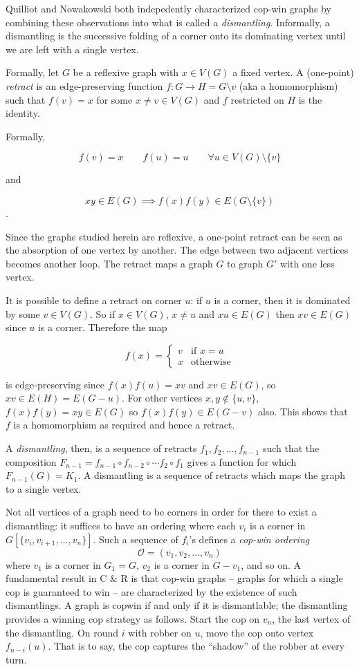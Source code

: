 Quilliot and Nowakowski both indepedently characterized cop-win graphs by combining these observations into what is called a \textit{dismantling}. Informally, a dismantling is the successive folding of a corner onto its dominating vertex until we are left with a single vertex.

Formally, let $G$ be a reflexive graph with $x\in V(G)$ a fixed vertex. A (one-point) \textit{retract} is an edge-preserving function $f : G \rightarrow H = G \setminus v$
(aka a homomorphism) such that $f(v) = x$ for some $x \neq v \in V(G)$ and $f$ restricted on $H$ is the identity.

Formally,

\[ f(v) = x \qquad f(u) = u \qquad \forall u \in V(G)\setminus \{ v \} \]

and

\[ xy \in E(G) \implies f(x)f(y) \in E(G \setminus \{ v \}) \].

Since the graphs studied herein are reflexive, a one-point retract can be seen as the
absorption of one vertex by another. The edge between two adjacent vertices becomes another loop.
The retract maps a graph $G$ to graph $G'$ with one less vertex.

It is possible to define a retract on corner $u$: if $u$ is a corner, then it is
dominated by some $v \in V(G)$. So if $x \in V(G)$, $x \neq u$ and
$xu \in E(G)$ then $xv \in E(G)$ since $u$ is a corner. Therefore the map

\[ f(x) = \begin{cases}
v & \text{if } x = u \\
x & \text{otherwise}
\end{cases} \]

is edge-preserving since $f(x)f(u) = xv$ and $xv \in E(G)$, so $xv \in E(H) = E(G - u)$.
For other vertices $x,y \not\in \{u,v\}$, $f(x)f(y) = xy \in E(G)$ so $f(x)f(y) \in E(G- v)$ also.
This shows that $f$ is a homomorphism as required and hence a retract.

A \textit{dismantling}, then, is a sequence of retracts $f_1, f_2, \dots, f_{n-1}$ such that the
composition $F_{n-1} = f_{n-1} \circ f_{n-2} \circ \cdots f_2 \circ f_1$ gives a
function for which $F_{n-1} (G) = K_1$. A dismantling is a sequence of retracts
which maps the graph to a single vertex.

Not all vertices of a graph need to be corners in order for there
to exist a dismantling: it suffices to have an ordering where each $v_i$ is a corner in
$G[\{v_i, v_{i+1}, \dots, v_n\}]$. Such a sequence of $f_i$'s defines a \textit{cop-win ordering}
\[ \mathcal{O} = ( v_1, v_2, \dots, v_n ) \]
where $v_1$ is a corner in $G_1 = G$, $v_2$ is a corner in $G - v_1$, and so on. A fundamental result in C \& R is that cop-win graphs -- graphs for which a single
cop is guaranteed to win --  are characterized by the existence of such dismantlings.
A graph is copwin if and only if it is dismantlable; the dismantling provides a winning cop strategy as follows. Start the cop on $v_n$, the last vertex of the dismantling. On round $i$ with robber on $u$, move the cop onto vertex $f_{n-i}(u)$. That is to say, the cop captures the ``shadow'' of the robber at every turn.

